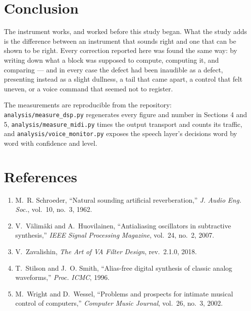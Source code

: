 \documentclass[a4paper,10pt,twocolumn]{article}
\newcommand{\code}[1]{\texttt{\small #1}}
\begin{document}
\section{Conclusion}

The instrument works, and worked before this study began. What the study adds
is the difference between an instrument that sounds right and one that can be
shown to be right. Every correction reported here was found the same way: by
writing down what a block was supposed to compute, computing it, and comparing
--- and in every case the defect had been inaudible as a defect, presenting
instead as a slight dullness, a tail that came apart, a control that felt
uneven, or a voice command that seemed not to register.

The measurements are reproducible from the repository:
\code{analysis/measure\_dsp.py} regenerates every figure and number in
Sections 4 and 5, \code{analysis/measure\_midi.py} times the output transport
and counts its traffic, and \code{analysis/voice\_monitor.py} exposes the
speech layer's decisions word by word with confidence and level.

\section*{References}
\small
\begin{enumerate}\itemsep1pt
\item M.~R. Schroeder, ``Natural sounding artificial reverberation,''
      \emph{J. Audio Eng. Soc.}, vol.~10, no.~3, 1962.
\item V.~V\"alim\"aki and A.~Huovilainen, ``Antialiasing oscillators in
      subtractive synthesis,'' \emph{IEEE Signal Processing Magazine},
      vol.~24, no.~2, 2007.
\item V.~Zavalishin, \emph{The Art of VA Filter Design}, rev.~2.1.0, 2018.
\item T.~Stilson and J.~O. Smith, ``Alias-free digital synthesis of classic
      analog waveforms,'' \emph{Proc. ICMC}, 1996.
\item M.~Wright and D.~Wessel, ``Problems and prospects for intimate musical
      control of computers,'' \emph{Computer Music Journal}, vol.~26, no.~3,
      2002.
\end{enumerate}
\end{document}
